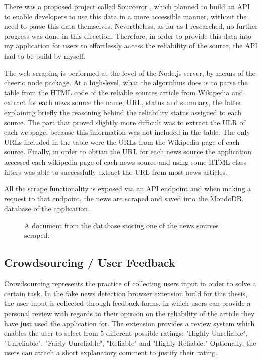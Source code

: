 There was a proposed project called Sourceror \cite{conf_wiki}, which planned to build an API to enable developers to use this data in a more accessible manner, without the need to parse this data themselves. Nevertheless, as far as I researched, no further progress was done in this direction. Therefore, in order to provide this data into my application for users to effortlessly access the reliability of the source, the API had to be build by myself.

The web-scraping is performed at the level of the Node.js server, by means of the cheerio node package. At a high-level, what the algorithms does is to parse the table from the HTML code of the reliable sources article from Wikipedia \cite{wiki_reliable_sources} and extract for each news source the name, URL, status and summary, the latter explaining briefly the reasoning behind the reliability status assigned to each source. The part that proved slightly more difficult was to extract the ULR of each webpage, because this information was not included in the table. The only URLs included in the table were the URLs from the Wikipedia page of each source. Finally, in order to obtian the URL for each news source the application accessed each wikipedia page of each news source and using some HTML class filters was able to successfully extract the URL from most news articles.

All the scrape functionality is exposed via an API endpoint and when making a request to that endpoint, the news are scraped and saved into the MondoDB. database of the application.

\begin{figure}[H]
  \centering
  \caption{A document from the database storing one of the news sources scraped.}
\end{figure}

\subsection{Crowdsourcing / User Feedback}

Crowdsourcing represents the practice of collecting users input in order to solve a certain task. In the fake news detection browser extension build for this thesis, the user input is collected through feedback forms, in which users can provide a personal review with regards to their opinion on the reliability of the article they have just used the application for. The extension provides a review system which enables the user to select from 5 different possible ratings: "Highly Unreliable", "Unreliable", "Fairly Unreliable", "Reliable" and "Highly Reliable." Optionally, the users can attach a short explanatory comment to justify their rating. 

